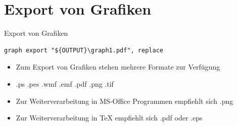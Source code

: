 \section{Export von Grafiken}
\begin{frame}[fragile]{Export von Grafiken} 
\begin{lstlisting}
graph export "${OUTPUT}\graph1.pdf", replace
\end{lstlisting}
\begin{itemize}
\item Zum Export von Grafiken stehen mehrere Formate zur Verfügung
\item .ps .pes .wmf .emf .pdf .png .tif
\item Zur Weiterverarbeitung in MS-Office Programmen empfiehlt sich .png
\item Zur Weiterverarbeitung in TeX empfiehlt sich .pdf oder .eps
\end{itemize}
\end{frame}